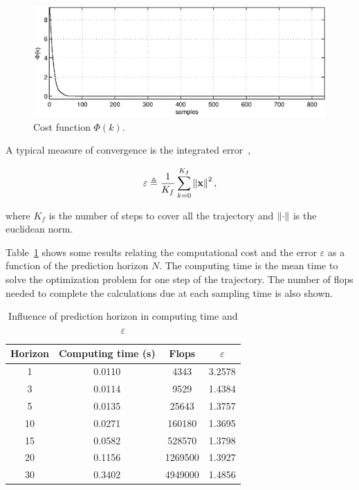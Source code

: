 \documentclass[conference]{IEEEtran} %
\begin{document}
\begin{figure}
	\centering
    	\includegraphics[width=.95\linewidth]{Figures/cost.eps}
    	\caption{Cost function $\Phi(k)$.}
    	\label{fig:cost}
\end{figure}

A typical measure of convergence is the integrated error~\cite{essen01},

\begin{equation*}
	\varepsilon \triangleq \frac{1}{K_f}\sum_{k=0}^{K_f}\left\|{\bf x}\right\|^2,
\end{equation*}

\noindent where $K_f$ is the number of steps to cover all the trajectory and
$\left\|{\bf\cdot}\right\|$ is the euclidean norm.

Table~\ref{table:table1} shows some results relating the computational cost
and the error $\varepsilon$ as a function of the prediction horizon $N$.
The computing time is the mean time to solve the optimization problem
for one step of the trajectory. The number of flops needed to complete the
calculations due at each sampling time is also shown.
 
\begin{table}[htpb]
 \caption{Influence of prediction horizon in computing time and $\varepsilon$}
 \label{table:table1}
 \centering
 \begin{tabular}{cccc}
  \hline
  Horizon & Computing time (s) & Flops & $\varepsilon$ \\
  \hline\hline
  1  & 0.0110 & 4343    & 3.2578  \\
  3  & 0.0114 & 9529    & 1.4384  \\
  5  & 0.0135 & 25643   & 1.3757  \\
  10 & 0.0271 & 160180  & 1.3695  \\
  15 & 0.0582 & 528570  & 1.3798  \\
  20 & 0.1156 & 1269500 & 1.3927  \\
  30 & 0.3402 & 4949000 & 1.4856  \\
  \hline
 \end{tabular}
\end{table}
 
\end{document}
